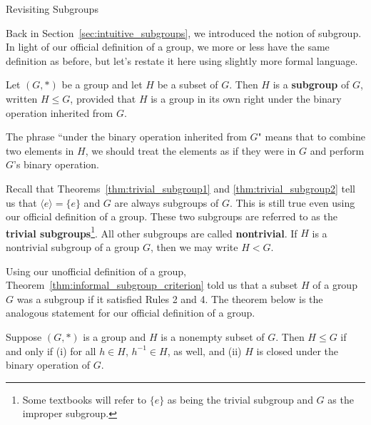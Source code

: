 \begin{section}{Revisiting Subgroups}

Back in Section~\ref{sec:intuitive_subgroups}, we introduced the notion of subgroup.  In light of our official definition of a group, we more or less have the same definition as before, but let's restate it here using slightly more formal language.

\begin{definition}
Let \((G,*)\) be a group and let \(H\) be a subset of \(G\).  Then \(H\) is a \textbf{subgroup} of \(G\), written \(H\leq G\), provided that \(H\) is a group in its own right under the binary operation inherited from \(G\).
\end{definition}

The phrase ``under the binary operation inherited from \(G\)" means that to combine two elements in \(H\), we should treat the elements as if they were in \(G\) and perform \(G\)'s binary operation.

Recall that Theorems~\ref{thm:trivial_subgroup1} and \ref{thm:trivial_subgroup2} tell us that \(\langle e\rangle=\{e\}\) and \(G\) are always subgroups of \(G\). This is still true even using our official definition of a group.  These two subgroups are referred to as the \textbf{trivial subgroups}\footnote{Some textbooks will refer to \(\{e\}\) as being the trivial subgroup and \(G\) as the improper subgroup.}.  All other subgroups are called \textbf{nontrivial}.  If \(H\) is a nontrivial subgroup of a group \(G\), then we may write \(H<G\).

Using our unofficial definition of a group, Theorem~\ref{thm:informal_subgroup_criterion} told us that a subset \(H\) of a group \(G\) was a subgroup if it satisfied Rules 2 and 4.  The theorem below is the analogous statement for our official definition of a group.

\begin{theorem}\label{thm:subgroup_criterion}
Suppose \((G,*)\) is a group and \(H\) is a nonempty subset of \(G\).  Then \(H\leq G\) if and only if (i) for all \(h\in H\), \(h^{-1} \in H\), as well, and (ii) \(H\) is closed under the binary operation of \(G\).
\end{theorem}


\end{section}
